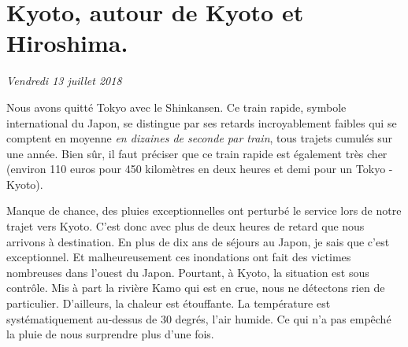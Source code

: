 \hypertarget{kyoto-autour-de-kyoto-et-hiroshima.}{%
\section{Kyoto, autour de Kyoto et
Hiroshima.}\label{kyoto-autour-de-kyoto-et-hiroshima.}}

\emph{Vendredi 13 juillet 2018}

Nous avons quitté Tokyo avec le Shinkansen. Ce train rapide, symbole
international du Japon, se distingue par ses retards incroyablement
faibles qui se comptent en moyenne \emph{en dizaines de seconde par
train}, tous trajets cumulés sur une année. Bien sûr, il faut préciser
que ce train rapide est également très cher (environ 110 euros pour 450
kilomètres en deux heures et demi pour un Tokyo - Kyoto).

Manque de chance, des pluies exceptionnelles ont perturbé le service
lors de notre trajet vers Kyoto. C'est donc avec plus de deux heures de
retard que nous arrivons à destination. En plus de dix ans de séjours au
Japon, je sais que c'est exceptionnel. Et malheureusement ces
inondations ont fait des victimes nombreuses dans l'ouest du Japon.
Pourtant, à Kyoto, la situation est sous contrôle. Mis à part la rivière
Kamo qui est en crue, nous ne détectons rien de particulier. D'ailleurs,
la chaleur est étouffante. La température est systématiquement au-dessus
de 30 degrés, l'air humide. Ce qui n'a pas empêché la pluie de nous
surprendre plus d'une fois.

